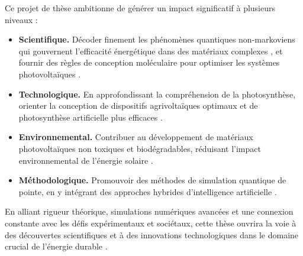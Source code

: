 \documentclass[12pt, a4paper]{article}
\begin{document}
Ce projet de thèse ambitionne de générer un impact significatif à plusieurs niveaux :
\begin{itemize}
    \item \textbf{Scientifique.} Décoder finement les phénomènes quantiques non-markoviens qui gouvernent l'efficacité énergétique dans des matériaux complexes \cite{Ablimit2024, Dutta2024}, et fournir des règles de conception moléculaire pour optimiser les systèmes photovoltaïques \cite{Navadel2025}.

    \item \textbf{Technologique.} En approfondissant la compréhension de la photosynthèse, orienter la conception de dispositifs agrivoltaïques optimaux et de photosynthèse artificielle plus efficaces \cite{Tang2023, Yan2023}.

    \item \textbf{Environnemental.} Contribuer au développement de matériaux photovoltaïques non toxiques et biodégradables, réduisant l'impact environnemental de l'énergie solaire \cite{Zeng2025}.

    \item \textbf{Méthodologique.} Promouvoir des méthodes de simulation quantique de pointe, en y intégrant des approches hybrides d'intelligence artificielle \cite{Dan2024, Seneviratne2024}.
\end{itemize}

En alliant rigueur théorique, simulations numériques avancées et une connexion constante avec les défis expérimentaux et sociétaux, cette thèse ouvrira la voie à des découvertes scientifiques et à des innovations technologiques dans le domaine crucial de l'énergie durable \cite{Metzler2023}.

\newpage



\end{document}

